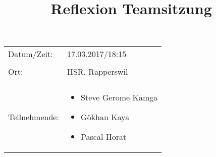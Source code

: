 \documentclass[10pt]{article}
\title{Reflexion Teamsitzung}
\date{}             %
\begin{document}
\maketitle




\begin{tabular}{l p{5cm}}


Datum/Zeit: & 17.03.2017/18:15 \\ \\

Ort: & HSR, Rapperswil \\ \\
Teilnehmende: & \begin{itemize} \item Steve Gerome Kamga\item Gökhan Kaya \item Pascal Horat \end{itemize}

\end{tabular}

\vspace{1cm}
\end{document}
